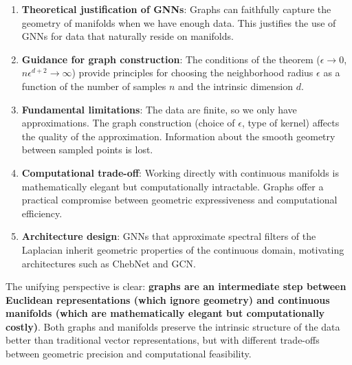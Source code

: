\begin{enumerate}
	\item \textbf{Theoretical justification of GNNs}: Graphs can faithfully capture the geometry of manifolds when we have enough data. This justifies the use of \glspl{GNN} for data that naturally reside on manifolds.

	\item \textbf{Guidance for graph construction}: The conditions of the theorem ($\epsilon \to 0$, $n\epsilon^{d+2} \to \infty$) provide principles for choosing the neighborhood radius $\epsilon$ as a function of the number of samples $n$ and the intrinsic dimension $d$.

	\item \textbf{Fundamental limitations}: The data are finite, so we only have approximations. The graph construction (choice of $\epsilon$, type of kernel) affects the quality of the approximation. Information about the smooth geometry between sampled points is lost.

	\item \textbf{Computational trade-off}: Working directly with continuous manifolds is mathematically elegant but computationally intractable. Graphs offer a practical compromise between geometric expressiveness and computational efficiency.

	\item \textbf{Architecture design}: \glspl{GNN} that approximate spectral filters of the Laplacian inherit geometric properties of the continuous domain, motivating architectures such as ChebNet and GCN.
\end{enumerate}

The unifying perspective is clear: \textbf{graphs are an intermediate step between Euclidean representations (which ignore geometry) and continuous manifolds (which are mathematically elegant but computationally costly)}. Both graphs and manifolds preserve the intrinsic structure of the data better than traditional vector representations, but with different trade-offs between geometric precision and computational feasibility.

